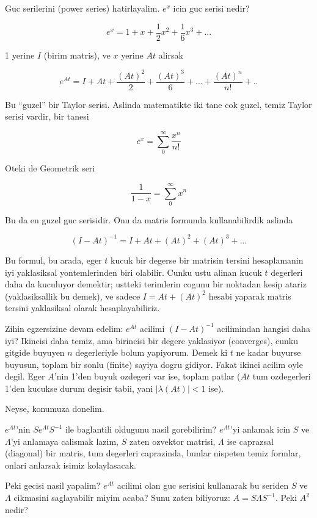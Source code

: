 \documentclass[12pt,fleqn]{article}
\begin{document}
Guc serilerini (power series) hatirlayalim. $e^{x}$ icin guc serisi nedir? 

\[ e^x = 1 + x + \frac{1}{2}x^2 + \frac{1}{6}x^3 + ... \]

1 yerine $I$ (birim matris), ve $x$ yerine $At$ alirsak

\[ e^{At} = I + At + \frac{(At)^2}{2} + \frac{(At)^3}{6} + ... +
 \frac{(At)^n}{n!} + ..
\]

Bu ``guzel'' bir Taylor serisi. Aslinda matematikte iki tane cok guzel,
temiz Taylor serisi vardir, bir tanesi

\[ e^x = \sum_0^{\infty} \frac{x^n}{n!} \]

Oteki de Geometrik seri

\[ \frac{1}{1-x} = \sum_0^{\infty} x^n\]

Bu da en guzel guc serisidir. Onu da matris formunda kullanabilirdik aslinda

\[ (I-At)^{-1} = I + At + (At)^2 + (At)^3 + ... \]

Bu formul, bu arada, eger $t$ kucuk bir degerse bir matrisin tersini
hesaplamanin iyi yaklasiksal yontemlerinden biri olabilir. Cunku ustu
alinan kucuk $t$ degerleri daha da kuculuyor demektir; ustteki terimlerin
cogunu bir noktadan kesip atariz (yaklasiksallik bu demek), ve sadece 
$I =
At + (At)^2$ hesabi yaparak matris tersini yaklasiksal olarak
hesaplayabiliriz.

Zihin egzersizine devam edelim: $e^{At}$ acilimi $(I-At)^{-1}$ acilimindan
hangisi daha iyi? Ikincisi daha temiz, ama birincisi bir degere yaklasiyor
(converges), cunku gitgide buyuyen $n$ degerleriyle bolum yapiyorum. Demek
ki $t$ ne kadar buyurse buyusun, toplam bir sonlu (finite) sayiya dogru
gidiyor. Fakat ikinci acilim oyle degil. Eger $A$'nin 1'den buyuk ozdegeri
var ise, toplam patlar ($At$ tum ozdegerleri 1'den kucukse durum degisir
tabii, yani $|\lambda(At)| < 1$ ise).

Neyse, konumuza donelim. 

$e^{At}$'nin $Se^{\Lambda t}S^{-1}$ ile baglantili oldugunu nasil
gorebilirim? $e^{At}$'yi anlamak icin $S$ ve $\Lambda$'yi anlamaya calismak
lazim, $S$ zaten ozvektor matrisi, $\Lambda$ ise caprazsal (diagonal) bir
matris, tum degerleri caprazinda, bunlar nispeten temiz formlar, onlari
anlarsak isimiz kolaylasacak.

Peki gecisi nasil yapalim? $e^{At}$ acilimi olan guc serisini kullanarak bu
seriden $S$ ve $\Lambda$ cikmasini saglayabilir miyim acaba? Sunu zaten
biliyoruz: $A = S \Lambda S^{-1}$. Peki $A^2$ nedir?
\end{document}
